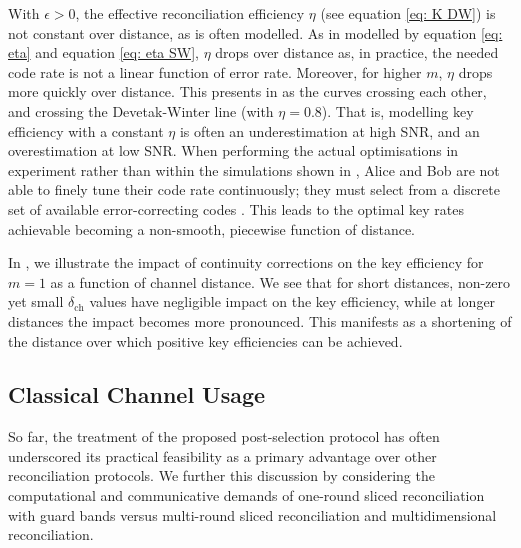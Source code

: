 ﻿\documentclass[12pt]{article}
\begin{document}
With $\epsilon > 0$, the effective reconciliation efficiency $\eta$ (see equation \eqref{eq: K DW}) is not constant over distance, as is often modelled. As in modelled by equation \eqref{eq: eta} and equation \eqref{eq: eta SW}, $\eta$ drops over distance as, in practice, the needed code rate is not a linear function of error rate. Moreover, for higher $m$, $\eta$ drops more quickly over distance. This presents in  as the curves crossing each other, and crossing the Devetak-Winter line (with $\eta = 0.8$). That is, modelling key efficiency with a constant $\eta$ is often an underestimation at high SNR, and an overestimation at low SNR. When performing the actual optimisations in experiment rather than within the simulations shown in , Alice and Bob are not able to finely tune their code rate continuously; they must select from a discrete set of available error-correcting codes \cite{Ma-2023}. This leads to the optimal key rates achievable becoming a non-smooth, piecewise function of distance.

In , we illustrate the impact of continuity corrections on the key efficiency for $m=1$ as a function of channel distance. We see that for short distances, non-zero yet small $\delta_\text{ch}$ values have negligible impact on the key efficiency, while at longer distances the impact becomes more pronounced. This manifests as a shortening of the distance over which positive key efficiencies can be achieved. 

\subsection{Classical Channel Usage}\label{subsec: classical channel usage}

So far, the treatment of the proposed post-selection protocol has often underscored its practical feasibility as a primary advantage over other reconciliation protocols. We further this discussion by considering the computational and communicative demands of one-round sliced reconciliation with guard bands versus multi-round sliced reconciliation and multidimensional reconciliation.
\end{document}
